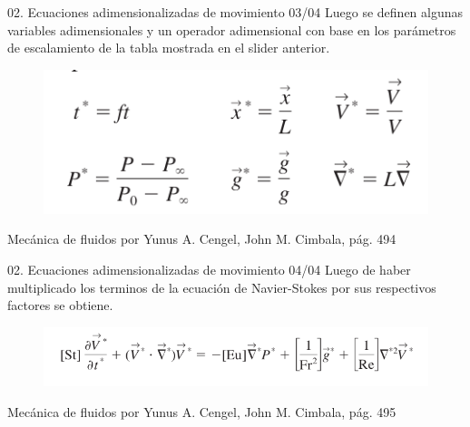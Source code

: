 \begin{frame}{02. Ecuaciones adimensionalizadas de movimiento 03/04}
\justifying
Luego se definen algunas variables adimensionales y un operador adimensional con base en los parámetros de escalamiento de la tabla mostrada en el slider anterior.
\begin{figure}[H]
\centering
\includegraphics[scale=0.3]{Section_Files/S3-imagenes-Jhon/0007.png}
\end{figure}
{\tiny Mecánica de fluidos por Yunus A. Cengel, John M. Cimbala, pág. 494}
\end{frame}

\begin{frame}{02. Ecuaciones adimensionalizadas de movimiento 04/04}
\justifying
Luego de haber multiplicado los terminos de la ecuación de Navier-Stokes por sus respectivos factores se obtiene.
\begin{figure}[H]
\centering
\includegraphics[scale=0.3]{Section_Files/S3-imagenes-Jhon/0015.png}
\end{figure}
{\tiny Mecánica de fluidos por Yunus A. Cengel, John M. Cimbala, pág. 495}
\end{frame}



